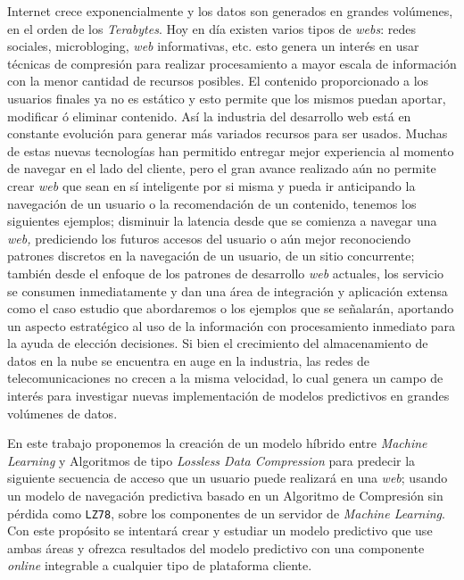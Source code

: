 
Internet crece exponencialmente  y los datos son generados en grandes volúmenes, en el orden de los \emph{Terabytes}. Hoy en día existen varios tipos de \emph{webs}: redes sociales, microbloging, \emph{web} informativas, etc. esto genera un interés en usar técnicas de compresión para realizar procesamiento a mayor escala de información con la menor cantidad de recursos posibles. El contenido proporcionado a los usuarios finales ya no es estático y esto permite que los mismos puedan  aportar, modificar ó eliminar contenido. Así  la industria del desarrollo web está en constante evolución para generar más variados recursos para ser usados. Muchas de estas nuevas tecnologías han permitido entregar mejor experiencia al momento de navegar en el lado del cliente, pero el gran avance realizado aún no permite crear \emph{web} que sean en sí inteligente por si misma y pueda ir anticipando la  navegación de un usuario o la recomendación de un contenido, tenemos los siguientes ejemplos; disminuir la latencia desde que se comienza a navegar una \emph{web,} prediciendo los futuros accesos del usuario o aún mejor reconociendo patrones discretos en la navegación de un usuario,  de un sitio concurrente; también desde el enfoque de los patrones de desarrollo \emph{web} actuales, los servicio  se consumen inmediatamente y dan una área de integración y  aplicación extensa como el caso estudio que abordaremos o los ejemplos que se señalarán, aportando un aspecto estratégico al uso de la información con procesamiento inmediato para la ayuda de elección decisiones.
Si bien el crecimiento del almacenamiento de datos en la nube se encuentra en auge en la industria, las redes de telecomunicaciones  no crecen a la misma velocidad, lo cual genera un campo de interés para investigar nuevas implementación de modelos predictivos en grandes volúmenes de datos. 

En este trabajo proponemos  la creación de un modelo híbrido entre \emph{Machine Learning} y Algoritmos de tipo \emph{Lossless Data Compression} para predecir la siguiente secuencia de acceso que un usuario puede realizará en una \emph{web}; usando un modelo de navegación predictiva basado en un Algoritmo de Compresión sin pérdida como \texttt{LZ78}, sobre los componentes de un servidor de \emph{Machine Learning}. Con este propósito se intentará crear y estudiar un modelo predictivo que use ambas áreas y  ofrezca resultados del modelo predictivo con una componente \emph{online} integrable a cualquier tipo de plataforma cliente.